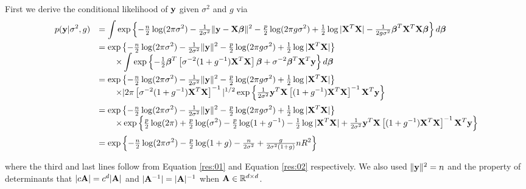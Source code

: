 \documentclass{amsart}[12pt]
\begin{document}
 
\noindent First we derive the conditional likelihood of ${\bf y}$ given $\sigma^2$ and $g$ via
$$
\begin{array}{rl}
\displaystyle p({\bf y}|\sigma^2,g) 
    & \displaystyle = \int \exp\left\{
    -\tfrac{n}{2}\log(2\pi\sigma^2) - \tfrac{1}{2\sigma^2}\|{\bf y} - {\bf X}{\boldsymbol \beta}\|^2
    -\tfrac{p}{2}\log(2\pi g\sigma^2) + \tfrac{1}{2}\log|{\bf X}^T{\bf X}| - \tfrac{1}{2g\sigma^2}{\boldsymbol \beta}^T{\bf X}^T{\bf X}{\boldsymbol \beta}
    \right\} d{\boldsymbol \beta}
    \\ [2ex]
    & \displaystyle = \exp\left\{
    -\tfrac{n}{2}\log(2\pi\sigma^2) - \tfrac{1}{2\sigma^2}\|{\bf y}\|^2 -\tfrac{p}{2}\log(2\pi g\sigma^2) + \tfrac{1}{2}\log|{\bf X}^T{\bf X}| \right\}
    \\
    & \displaystyle \qquad \times \int 
    \exp\left\{ - \tfrac{1}{2}{\boldsymbol \beta}^T \left[ \sigma^{-2}(1+g^{-1}){\bf X}^T{\bf X} \right]{\boldsymbol\beta} + \sigma^{-2}{\boldsymbol \beta}^T{\bf X}^T{\bf y}
    \right\} d{\boldsymbol \beta} \\ [2ex]
    & \displaystyle = \exp\left\{
    -\tfrac{n}{2}\log(2\pi\sigma^2) - \tfrac{1}{2\sigma^2}\|{\bf y}\|^2 -\tfrac{p}{2}\log(2\pi g\sigma^2) + \tfrac{1}{2}\log|{\bf X}^T{\bf X}| \right\}
    \\
    & \displaystyle \qquad \times 
    |2\pi \left[ \sigma^{-2}(1+g^{-1}){\bf X}^T{\bf X} \right]^{-1}|^{1/2}\exp\left\{  \tfrac{1}{2\sigma^2}  {\bf y}^T{\bf X}\left[ (1+g^{-1}){\bf X}^T{\bf X} \right]^{-1}{\bf X}^T{\bf y}
    \right\}
    \\ [2ex]
    & \displaystyle = \exp\left\{
    -\tfrac{n}{2}\log(2\pi\sigma^2) 
    - \tfrac{1}{2\sigma^2}\|{\bf y}\|^2 
    -\tfrac{p}{2}\log(2\pi g\sigma^2) 
    + \tfrac{1}{2}\log|{\bf X}^T{\bf X}| \right\}
    \\
    & \displaystyle \qquad \times 
    \exp\left\{ 
    \tfrac{p}{2}\log(2\pi) 
    + \tfrac{p}{2}\log(\sigma^2)
    - \tfrac{p}{2}\log(1+g^{-1})
    - \tfrac{1}{2}\log|{\bf X}^T{\bf X}| 
    + \tfrac{1}{2\sigma^2}  {\bf y}^T{\bf X}\left[ (1+g^{-1}){\bf X}^T{\bf X} \right]^{-1}{\bf X}^T{\bf y}
    \right\}
    \\ [2ex]
& \displaystyle = \exp\left\{
-\tfrac{n}{2}\log(2\pi\sigma^2) 
- \tfrac{p}{2}\log(1+g)
- \tfrac{n}{2\sigma^2} 
+ \tfrac{g}{2\sigma^2(1+g)} n R^2
\right\}
\end{array}
$$

\noindent where the third and last lines follow from
Equation \ref{res:01} and Equation \ref{res:02} respectively.
We also used $\|{\bf y}\|^2 = n$ and the property of determinants that $|c{\bf A}| = c^d|{\bf A}|$ and $|{\bf A}^{-1}| = |{\bf A}|^{-1}$ when ${\bf A} \in{\mathbb R}^{d\times d}$.

\end{document}
